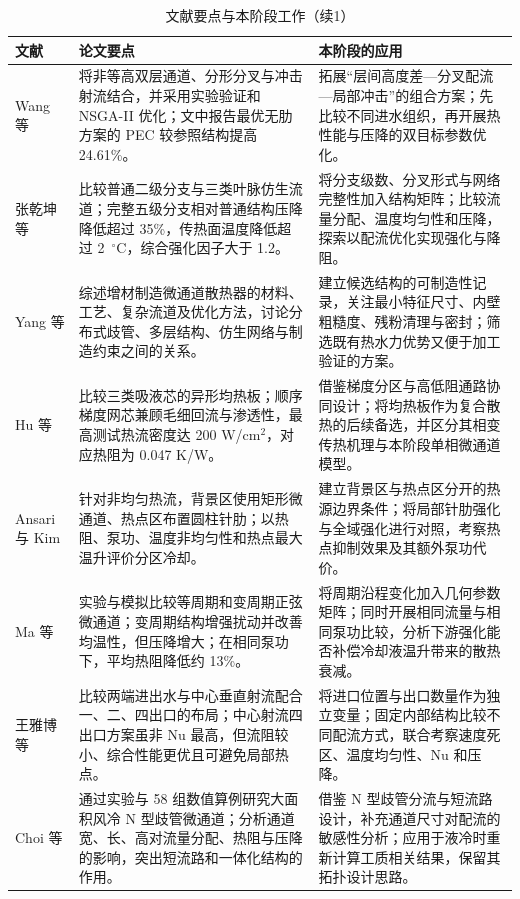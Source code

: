 \documentclass[stage1,fontset=fandol]{ydzjreport}
\begin{document}
	\begin{table}[H]
	  \centering
	  \small
	  \renewcommand{\arraystretch}{1.12}
	  \caption{文献要点与本阶段工作（续1）}
	  \label{tab:notes-cont-2}
	  \begin{tabularx}{\textwidth}{@{}>{\RaggedRight\arraybackslash}p{} Y Y@{}}
	    \toprule
	     文献 & 论文要点 & 本阶段的应用 \\
	    \midrule
	    Wang 等\cite{ref5} & 将非等高双层通道、分形分叉与冲击射流结合，并采用实验验证和 NSGA-II 优化；文中报告最优无肋方案的 PEC 较参照结构提高 24.61\%。 & 拓展“层间高度差—分叉配流—局部冲击”的组合方案；先比较不同进水组织，再开展热性能与压降的双目标参数优化。 \\[3pt]
	    张乾坤等\cite{ref6} & 比较普通二级分支与三类叶脉仿生流道；完整五级分支相对普通结构压降降低超过 35\%，传热面温度降低超过 2 $\,{}^\circ\mathrm{C}$，综合强化因子大于 1.2。 & 将分支级数、分叉形式与网络完整性加入结构矩阵；比较流量分配、温度均匀性和压降，探索以配流优化实现强化与降阻。 \\[3pt]
	    Yang 等\cite{ref7} & 综述增材制造微通道散热器的材料、工艺、复杂流道及优化方法，讨论分布式歧管、多层结构、仿生网络与制造约束之间的关系。 & 建立候选结构的可制造性记录，关注最小特征尺寸、内壁粗糙度、残粉清理与密封；筛选既有热水力优势又便于加工验证的方案。 \\[3pt]
	    Hu 等\cite{ref8} & 比较三类吸液芯的异形均热板；顺序梯度网芯兼顾毛细回流与渗透性，最高测试热流密度达 200 W/cm$^2$，对应热阻为 0.047 K/W。 & 借鉴梯度分区与高低阻通路协同设计；将均热板作为复合散热的后续备选，并区分其相变传热机理与本阶段单相微通道模型。 \\[3pt]
	   
	    
	    Ansari 与 Kim\cite{ref13} & 针对非均匀热流，背景区使用矩形微通道、热点区布置圆柱针肋；以热阻、泵功、温度非均匀性和热点最大温升评价分区冷却。 & 建立背景区与热点区分开的热源边界条件；将局部针肋强化与全域强化进行对照，考察热点抑制效果及其额外泵功代价。 \\[3pt]
	    
	    Ma 等\cite{ref15} & 实验与模拟比较等周期和变周期正弦微通道；变周期结构增强扰动并改善均温性，但压降增大；在相同泵功下，平均热阻降低约 13\%。 & 将周期沿程变化加入几何参数矩阵；同时开展相同流量与相同泵功比较，分析下游强化能否补偿冷却液温升带来的散热衰减。 \\[3pt]
	    
	    王雅博等\cite{ref16} & 比较两端进出水与中心垂直射流配合一、二、四出口的布局；中心射流四出口方案虽非 Nu 最高，但流阻较小、综合性能更优且可避免局部热点。 & 将进口位置与出口数量作为独立变量；固定内部结构比较不同配流方式，联合考察速度死区、温度均匀性、Nu 和压降。 \\[3pt]
	    
	    Choi 等\cite{ref17} & 通过实验与 58 组数值算例研究大面积风冷 N 型歧管微通道；分析通道宽、长、高对流量分配、热阻与压降的影响，突出短流路和一体化结构的作用。 & 借鉴 N 型歧管分流与短流路设计，补充通道尺寸对配流的敏感性分析；应用于液冷时重新计算工质相关结果，保留其拓扑设计思路。 \\[3pt]
	    \bottomrule
	  \end{tabularx}
	\end{table}
\end{document}
